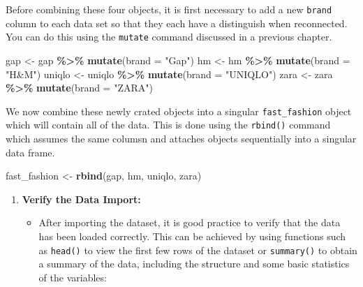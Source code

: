 \documentclass[
]{book}
\newenvironment{Shaded}{\begin{snugshade}}{\end{snugshade}}
\newcommand{\AttributeTok}[1]{\textcolor[rgb]{0.13,0.29,0.53}{#1}}
\newcommand{\FunctionTok}[1]{\textcolor[rgb]{0.13,0.29,0.53}{\textbf{#1}}}
\newcommand{\NormalTok}[1]{#1}
\newcommand{\OtherTok}[1]{\textcolor[rgb]{0.56,0.35,0.01}{#1}}
\newcommand{\SpecialCharTok}[1]{\textcolor[rgb]{0.81,0.36,0.00}{\textbf{#1}}}
\newcommand{\StringTok}[1]{\textcolor[rgb]{0.31,0.60,0.02}{#1}}
\providecommand{\tightlist}{%
  \setlength{\itemsep}{0pt}\setlength{\parskip}{0pt}}
\begin{document}
Before combining these four objects, it is first necessary to add a new \texttt{brand} column to each data set so that they each have a distinguish when reconnected. You can do this using the \texttt{mutate} command discussed in a previous chapter.

\begin{Shaded}
\begin{Highlighting}[]
\NormalTok{gap }\OtherTok{\textless{}{-}}\NormalTok{ gap }\SpecialCharTok{\%\textgreater{}\%}
  \FunctionTok{mutate}\NormalTok{(}\AttributeTok{brand =} \StringTok{"Gap"}\NormalTok{)}
\NormalTok{hm }\OtherTok{\textless{}{-}}\NormalTok{ hm }\SpecialCharTok{\%\textgreater{}\%}
  \FunctionTok{mutate}\NormalTok{(}\AttributeTok{brand =} \StringTok{"H\&M"}\NormalTok{)}
\NormalTok{uniqlo }\OtherTok{\textless{}{-}}\NormalTok{ uniqlo }\SpecialCharTok{\%\textgreater{}\%}
  \FunctionTok{mutate}\NormalTok{(}\AttributeTok{brand =} \StringTok{"UNIQLO"}\NormalTok{)}
\NormalTok{zara }\OtherTok{\textless{}{-}}\NormalTok{ zara }\SpecialCharTok{\%\textgreater{}\%}
  \FunctionTok{mutate}\NormalTok{(}\AttributeTok{brand =} \StringTok{"ZARA"}\NormalTok{)}
\end{Highlighting}
\end{Shaded}

We now combine these newly crated objects into a singular \texttt{fast\_fashion} object which will contain all of the data. This is done using the \texttt{rbind()} command which assumes the same columsn and attaches objects sequentially into a singular data frame.

\begin{Shaded}
\begin{Highlighting}[]
\NormalTok{fast\_fashion }\OtherTok{\textless{}{-}} \FunctionTok{rbind}\NormalTok{(gap, hm, uniqlo, zara)}
\end{Highlighting}
\end{Shaded}

\begin{enumerate}
\def\labelenumi{\arabic{enumi}.}
\setcounter{enumi}{2}
\tightlist
\item
  \textbf{Verify the Data Import:}

  \begin{itemize}
  \tightlist
  \item
    After importing the dataset, it is good practice to verify that the data has been loaded correctly. This can be achieved by using functions such as \texttt{head()} to view the first few rows of the dataset or \texttt{summary()} to obtain a summary of the data, including the structure and some basic statistics of the variables:
  \end{itemize}
\end{enumerate}
\end{document}
